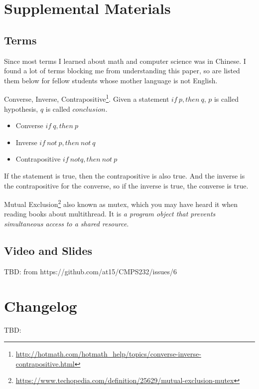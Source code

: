 \documentclass[12pt,a4paper,oneside]{article}
\begin{document}
\section{Supplemental Materials}

\subsection{Terms} \label{l1}

Since most terms I learned about math and computer science was in Chinese. I found a lot of terms blocking
me from understanding this paper, so are listed them below for fellow students whose mother language is not English.

\medskip

Converse, Inverse, Contrapositive\footnote{\url{http://hotmath.com/hotmath_help/topics/converse-inverse-contrapositive.html}}.
Given a statement $if\ p, then\ q$, $p$ is called hypothesis, $q$ is called $conclusion$.

\begin{itemize}
    \item Converse  $if\ q, then\ p$
    \item Inverse $if\ not\ p, then\ not\ q$
    \item Contrapositive $if\ not q, then\ not\ p$
\end{itemize}

If the statement is true, then the contrapositive is also true.
And the inverse is the contrapositive for the converse, so if the inverse is true, the converse is true.

\medskip

Mutual Exclusion\footnote{\url{https://www.techopedia.com/definition/25629/mutual-exclusion-mutex}}
also known as mutex, which you may have heard it when reading books about multithread.
It is \textit{a program object that prevents simultaneous access to a shared resource}.

\subsection{Video and Slides}

TBD: from https://github.com/at15/CMPS232/issues/6

\section{Changelog}

TBD:

\printbibliography
\end{document}
